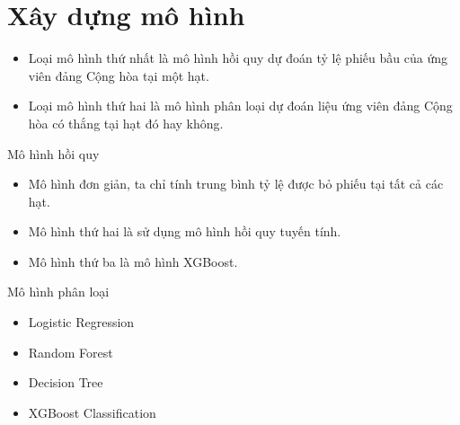 \documentclass[10pt]{beamer}
\theoremstyle{remark}
\theoremstyle{definition}
\begin{document}
\section{Xây dựng mô hình}

\begin{frame}
	\begin{itemize}
		\item Loại mô hình thứ nhất là mô hình hồi quy dự đoán tỷ lệ phiếu bầu của ứng viên đảng Cộng hòa tại một hạt.
		\item Loại mô hình thứ hai là mô hình phân loại dự đoán liệu ứng viên đảng Cộng hòa có thắng tại hạt đó hay không.
	\end{itemize}
\end{frame}

\begin{frame}{Mô hình hồi quy}

    \begin{itemize}
        \item Mô hình đơn giản, ta chỉ tính trung bình tỷ lệ được bỏ phiếu tại tất cả các hạt.
        \item Mô hình thứ hai là sử dụng mô hình hồi quy tuyến tính.
        \item Mô hình thứ ba là mô hình XGBoost.
    \end{itemize}
\end{frame}

\begin{frame}{Mô hình phân loại}
	\begin{itemize}
        \item Logistic Regression
        \item Random Forest
        \item Decision Tree
        \item XGBoost Classification
    \end{itemize}
\end{frame}
\end{document}
